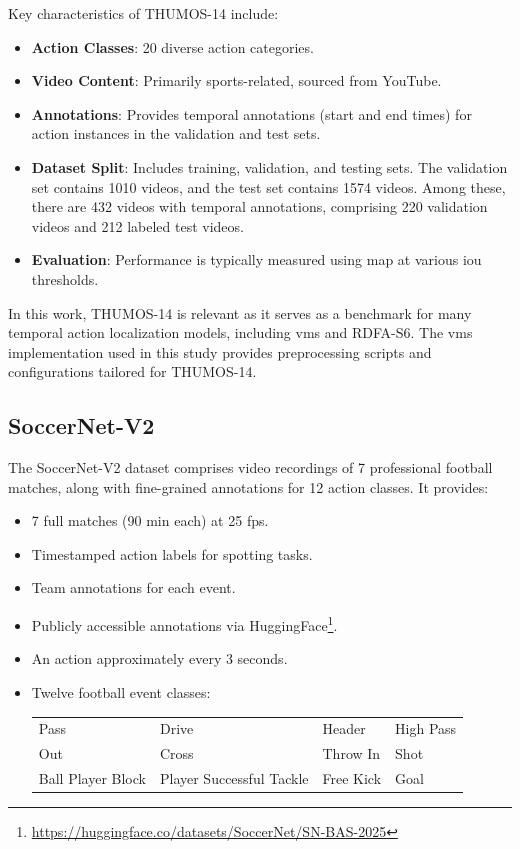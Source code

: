 Key characteristics of THUMOS-14 include:
\begin{itemize}
    \item \textbf{Action Classes}: 20 diverse action categories.
    \item \textbf{Video Content}: Primarily sports-related, sourced from YouTube.
    \item \textbf{Annotations}: Provides temporal annotations (start and end times) for action instances in the validation and test sets.
    \item \textbf{Dataset Split}: Includes training, validation, and testing sets. The validation set contains 1010 videos, and the test set contains 1574 videos. Among these, there are 432 videos with temporal annotations, comprising 220 validation videos and 212 labeled test videos. 
    \item \textbf{Evaluation}: Performance is typically measured using \acrfull{map} at various \acrfull{iou} thresholds.
\end{itemize}

In this work, THUMOS-14 is relevant as it serves as a benchmark for many temporal action localization models, including \acrshort{vms} and RDFA-S6. The \acrshort{vms} implementation used in this study provides preprocessing scripts and configurations tailored for THUMOS-14.

\subsection{SoccerNet-V2}
\label{ssec:dataset_soccernet}

The SoccerNet-V2 dataset \cite{deliege_soccernet-v2_dataset_2021} comprises video recordings of 7 professional football matches, along with fine-grained annotations for 12 action classes. It provides:
\begin{itemize}
    \item 7 full matches (90 min each) at 25 fps.
    \item Timestamped action labels for spotting tasks.
    \item Team annotations for each event.
    \item Publicly accessible annotations via HuggingFace\footnote{\url{https://huggingface.co/datasets/SoccerNet/SN-BAS-2025}}.
    \item An action approximately every 3 seconds. 
    \item Twelve football event classes:
        \begin{center}
            \begin{tabular}{llll}
                Pass & Drive & Header & High Pass \\
                Out & Cross & Throw In & Shot \\
                Ball Player Block & Player Successful Tackle & Free Kick & Goal
            \end{tabular}
        \end{center}
\end{itemize}

